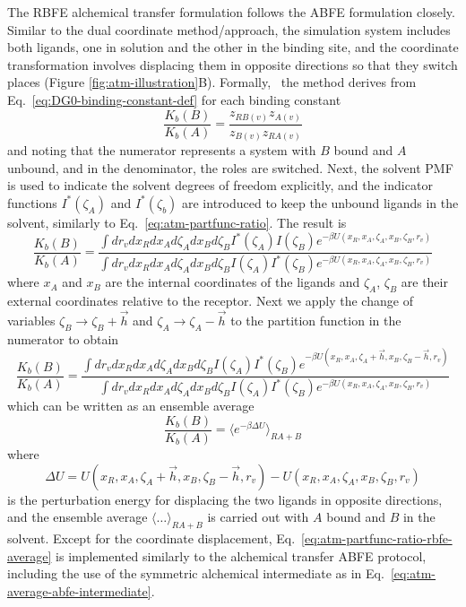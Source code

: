 \documentclass[9pt,bestpractices]{livecoms}
\begin{document}
The RBFE alchemical transfer formulation follows the ABFE formulation closely. Similar to the dual coordinate method/approach, the simulation system includes both ligands, one in solution and the other in the binding site, and the coordinate transformation involves displacing them in opposite directions so that they switch places (Figure \ref{fig:atm-illustration}B). Formally,~\cite{azimi2022relative} the method derives from Eq.~\ref{eq:DG0-binding-constant-def} for each binding constant
\begin{equation}
\frac{K_b(B)}{K_b(A)} = \frac{z_{RB(v)} z_{A(v)}}{z_{B(v)} z_{RA(v)}}
\end{equation}
and noting that the numerator represents a system with $B$ bound and $A$ unbound, and in the denominator, the roles are switched. Next, the solvent PMF is used to indicate the solvent degrees of freedom explicitly, and the indicator functions $I^\ast(\zeta_A)$ and $I^\ast(\zeta_b)$ are introduced to keep the unbound ligands in the solvent, similarly to Eq.~\ref{eq:atm-partfunc-ratio}. The result is
\begin{equation}\label{eq:atm-partfunc-ratio-rbfe-1}
  \frac{K_b(B)}{K_b(A)} = \frac{
    \int dr_v dx_R dx_A d\zeta_A dx_B d\zeta_B I^\ast(\zeta_A) I(\zeta_B)  e^{-\beta U(x_R, x_A, \zeta_A, x_B, \zeta_B, r_v)}
  }{
    \int dr_v dx_R dx_A d\zeta_A dx_B d\zeta_B I(\zeta_A) I^\ast(\zeta_B)  e^{-\beta U(x_R, x_A, \zeta_A, x_B, \zeta_B, r_v)}
  }
\end{equation}
where $x_A$ and $x_B$ are the internal coordinates of the ligands and $\zeta_A$, $\zeta_B$ are their external coordinates relative to the receptor.  Next we apply the change of variables $\zeta_B \rightarrow \zeta_B + \vec{h}$ and $\zeta_A \rightarrow \zeta_A - \vec{h}$ to the partition function in the numerator to obtain
\begin{equation}\label{eq:atm-partfunc-ratio-rbfe-2}
  \frac{K_b(B)}{K_b(A)} = \frac{
    \int dr_v dx_R dx_A d\zeta_A dx_B d\zeta_B I(\zeta_A) I^\ast(\zeta_B)  e^{-\beta U(x_R, x_A, \zeta_A + \vec{h}, x_B, \zeta_B - \vec{h}, r_v)}
  }{
    \int dr_v dx_R dx_A d\zeta_A dx_B d\zeta_B I(\zeta_A) I^\ast(\zeta_B)  e^{-\beta U(x_R, x_A, \zeta_A, x_B, \zeta_B, r_v)}
  }
\end{equation}
which can be written as an ensemble average
\begin{equation}\label{eq:atm-partfunc-ratio-rbfe-average}
\frac{K_b(B)}{K_b(A)} = \langle e^{-\beta \Delta U}\rangle_{RA+B}
\end{equation}
where
\begin{equation}\label{eq:atm-partfunc-ratio-rbfe-pert}
\Delta U = U(x_R, x_A, \zeta_A + \vec{h}, x_B, \zeta_B - \vec{h}, r_v) - U(x_R, x_A, \zeta_A, x_B, \zeta_B, r_v)
\end{equation}
is the perturbation energy for displacing the two ligands in opposite directions, and the ensemble average $\langle \ldots \rangle_{RA+B}$ is carried out with $A$ bound and $B$ in the solvent. Except for the coordinate displacement, Eq.~\ref{eq:atm-partfunc-ratio-rbfe-average} is implemented similarly to the alchemical transfer ABFE protocol, including the use of the symmetric alchemical intermediate as in Eq.~\ref{eq:atm-average-abfe-intermediate}.
\end{document}
